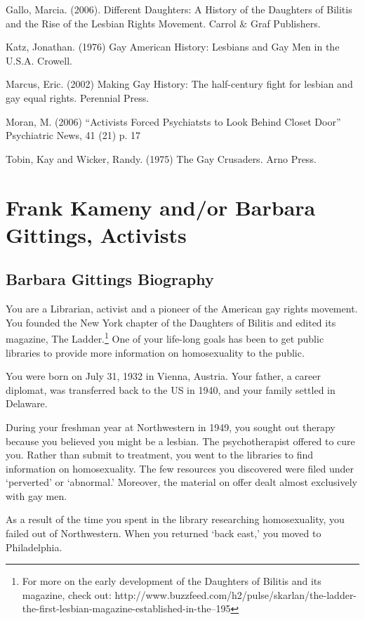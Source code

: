 Gallo, Marcia. (2006). Different Daughters: A History of the Daughters of Bilitis and the Rise of the Lesbian Rights Movement. Carrol \& Graf Publishers.

Katz, Jonathan. (1976) Gay American History: Lesbians and Gay Men in the U.S.A. Crowell.

Marcus, Eric. (2002) Making Gay History: The half-century fight for lesbian and gay equal rights. Perennial Press.

Moran, M. (2006) ``Activists Forced Psychiatsts to Look Behind Closet Door'' Psychiatric News, 41 (21) p. 17

Tobin, Kay and Wicker, Randy. (1975) The Gay Crusaders. Arno Press.

\chapter{Frank Kameny and\slash or Barbara Gittings, Activists}
\label{frankkamenyandorbarbaragittingsactivists}

\section{Barbara Gittings Biography}
\label{barbaragittingsbiography}

You are a Librarian, activist and a pioneer of the American gay rights movement. You founded the New York chapter of the Daughters of Bilitis and edited its magazine, The Ladder.\footnote{For more on the early development of the Daughters of Bilitis and its magazine, check out: http:\slash \slash www.buzzfeed.com\slash h2\slash pulse\slash skarlan\slash the-ladder-the-first-lesbian-magazine-established-in-the--195} One of your life-long goals has been to get public libraries to provide more information on homosexuality to the public.

You were born on July 31, 1932 in Vienna, Austria. Your father, a career diplomat, was transferred back to the US in 1940, and your family settled in Delaware.

During your freshman year at Northwestern in 1949, you sought out therapy because you believed you might be a lesbian. The psychotherapist offered to cure you. Rather than submit to treatment, you went to the libraries to find information on homosexuality. The few resources you discovered were filed under `perverted' or `abnormal.' Moreover, the material on offer dealt almost exclusively with gay men.

As a result of the time you spent in the library researching homosexuality, you failed out of Northwestern. When you returned `back east,' you moved to Philadelphia.


